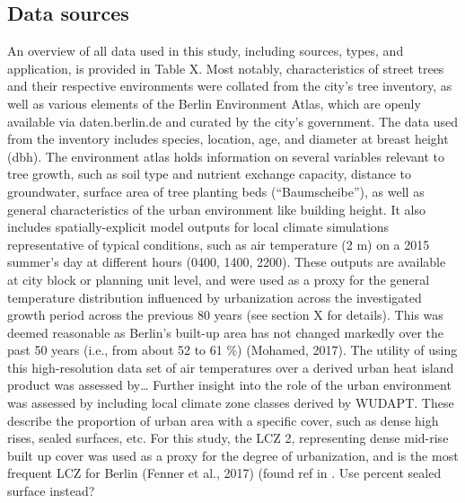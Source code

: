 \documentclass[
]{article}
\begin{document}
\hypertarget{data-sources}{%
\subsection{Data sources}\label{data-sources}}

An overview of all data used in this study, including sources, types, and application, is provided in Table X.
Most notably, characteristics of street trees and their respective environments were collated from the city's tree inventory, as well as various elements of the Berlin Environment Atlas, which are openly available via daten.berlin.de and curated by the city's government.
The data used from the inventory includes species, location, age, and diameter at breast height (dbh).
The environment atlas holds information on several variables relevant to tree growth, such as soil type and nutrient exchange capacity, distance to groundwater, surface area of tree planting beds (``Baumscheibe''), as well as general characteristics of the urban environment like building height.
It also includes spatially-explicit model outputs for local climate simulations representative of typical conditions, such as air temperature (2 m) on a 2015 summer's day at different hours (0400, 1400, 2200).
These outputs are available at city block or planning unit level, and were used as a proxy for the general temperature distribution influenced by urbanization across the investigated growth period across the previous 80 years (see section X for details).
This was deemed reasonable as Berlin's built-up area has not changed markedly over the past 50 years (i.e., from about 52 to 61 \%) (Mohamed, 2017).
The utility of using this high-resolution data set of air temperatures over a derived urban heat island product was assessed by\ldots{}
Further insight into the role of the urban environment was assessed by including local climate zone classes derived by WUDAPT.
These describe the proportion of urban area with a specific cover, such as dense high rises, sealed surfaces, etc.
For this study, the LCZ 2, representing dense mid-rise built up cover was used as a proxy for the degree of urbanization, and is the most frequent LCZ for Berlin (Fenner et al., 2017) (found ref in .
Use percent sealed surface instead?
\end{document}
